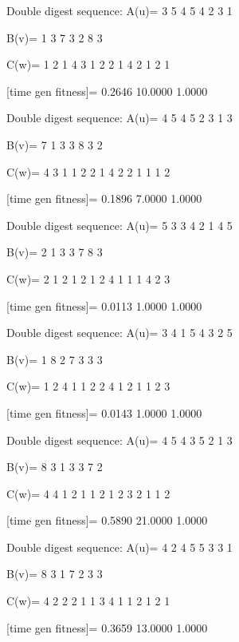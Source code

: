 Double digest sequence:
A(u)=
     3     5     4     5     4     2     3     1

B(v)=
     1     3     7     3     2     8     3

C(w)=
     1     2     1     4     3     1     2     2     1     4     2     1     2     1

[time gen fitness]=
    0.2646   10.0000    1.0000

Double digest sequence:
A(u)=
     4     5     4     5     2     3     1     3

B(v)=
     7     1     3     3     8     3     2

C(w)=
     4     3     1     1     2     2     1     4     2     2     1     1     1     2

[time gen fitness]=
    0.1896    7.0000    1.0000

Double digest sequence:
A(u)=
     5     3     3     4     2     1     4     5

B(v)=
     2     1     3     3     7     8     3

C(w)=
     2     1     2     1     2     1     2     4     1     1     1     4     2     3

[time gen fitness]=
    0.0113    1.0000    1.0000

Double digest sequence:
A(u)=
     3     4     1     5     4     3     2     5

B(v)=
     1     8     2     7     3     3     3

C(w)=
     1     2     4     1     1     2     2     4     1     2     1     1     2     3

[time gen fitness]=
    0.0143    1.0000    1.0000

Double digest sequence:
A(u)=
     4     5     4     3     5     2     1     3

B(v)=
     8     3     1     3     3     7     2

C(w)=
     4     4     1     2     1     1     2     1     2     3     2     1     1     2

[time gen fitness]=
    0.5890   21.0000    1.0000

Double digest sequence:
A(u)=
     4     2     4     5     5     3     3     1

B(v)=
     8     3     1     7     2     3     3

C(w)=
     4     2     2     2     1     1     3     4     1     1     2     1     2     1

[time gen fitness]=
    0.3659   13.0000    1.0000

